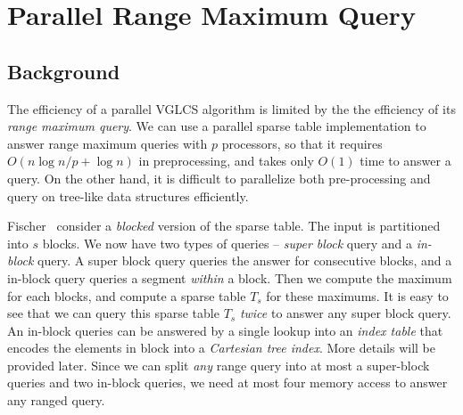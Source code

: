 \section{Parallel Range Maximum Query}
\label{sec:parallelRMQ}

\subsection{Background}

The efficiency of a parallel VGLCS algorithm is limited by the the
efficiency of its {\em range maximum query}.  We can use a parallel
sparse table implementation to answer range maximum queries with $p$
processors, so that it requires $O(n \log n / p + \log n)$ in
preprocessing, and takes only $O(1)$ time to answer a query.  On the
other hand, it is difficult to parallelize both pre-processing and
query on tree-like data structures efficiently.

Fischer~\cite{Fischer2006TheoreticalAP} consider a {\em blocked}
version of the sparse table.  The input is partitioned into $s$ blocks.
We now have two types of queries -- {\em super block} query and a {\em
  in-block} query.  A super block query queries the answer for
consecutive blocks, and a in-block query queries a segment {\em
  within} a block.  Then we compute the maximum for each blocks, and
compute a sparse table $T_s$ for these maximums.  It is easy to see
that we can query this sparse table $T_s$ {\em twice} to answer any
super block query.  An in-block queries can be answered by a single
lookup into an {\em index table} that encodes the elements in block
into a {\em Cartesian tree index}.  More details will be provided
later.  Since we can split {\em any} range query into at most a
super-block queries and two in-block queries, we need at most four
memory access to answer any ranged query.

